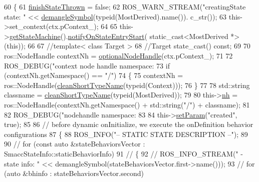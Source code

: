 \begin{DoxyCode}
60   \{
61     \hyperlink{classsmacc_1_1SmaccState_a6c40f733c35ddfb9ae2a2f8e9bab07d3}{finishStateThrown} = \textcolor{keyword}{false};
62     ROS\_WARN\_STREAM(\textcolor{stringliteral}{"creatingState state: "} << \hyperlink{namespacesmacc_a458f5e70d468824fbcd66cc7729deaa8}{demangleSymbol}(\textcolor{keyword}{typeid}(MostDerived).name()).
      c\_str());
63     this->set\_context(ctx.pContext\_);
64 
65     this->\hyperlink{classsmacc_1_1SmaccState_afc39f8e0ca4001b2159a100da2fccd0e}{getStateMachine}().\hyperlink{classsmacc_1_1ISmaccStateMachine_aeec54e997d715b105ebfeb5caadc4fbf}{notifyOnStateEntryStart}(
      static\_cast<MostDerived *>(\textcolor{keyword}{this}));
66 
67     \textcolor{comment}{//template< class Target >}
68     \textcolor{comment}{//Target state\_cast() const;}
69 
70     ros::NodeHandle contextNh = \hyperlink{namespacesmacc_aaf5c46d2834edc391571efd0acd05e6f}{optionalNodeHandle}(ctx.pContext\_);
71 
72     ROS\_DEBUG(\textcolor{stringliteral}{"context node handle namespace: %
73     \textcolor{keywordflow}{if} (contextNh.getNamespace() == \textcolor{stringliteral}{"/"})
74     \{
75       contextNh = ros::NodeHandle(\hyperlink{namespacesmacc_a09b297b1cdb9aae93a958f323431464a}{cleanShortTypeName}(\textcolor{keyword}{typeid}(Context)));
76     \}
77 
78     std::string classname = \hyperlink{namespacesmacc_a09b297b1cdb9aae93a958f323431464a}{cleanShortTypeName}(\textcolor{keyword}{typeid}(MostDerived));
79 
80     this->\hyperlink{classsmacc_1_1ISmaccState_a13fe6e6abfdb87996402189d44b78494}{nh} = ros::NodeHandle(contextNh.getNamespace() + std::string(\textcolor{stringliteral}{"/"}) + classname);
81 
82     ROS\_DEBUG(\textcolor{stringliteral}{"nodehandle namespace: %
83 
84     this->\hyperlink{classsmacc_1_1ISmaccState_a0b6c531ca8c446052022308548f55b92}{setParam}(\textcolor{stringliteral}{"created"}, \textcolor{keyword}{true});
85 
86     \textcolor{comment}{// before dynamic onInitialize, we execute the onDefinition behavior configurations}
87     \{
88       ROS\_INFO(\textcolor{stringliteral}{"-- STATIC STATE DESCRIPTION --"});
89 
90       \textcolor{comment}{// for (const auto &stateBehaviorsVector : SmaccStateInfo::staticBehaviorInfo)}
91       \textcolor{comment}{// \{}
92       \textcolor{comment}{//   ROS\_INFO\_STREAM(" - state info: " << demangleSymbol(stateBehaviorsVector.first->name()));}
93       \textcolor{comment}{//   for (auto &bhinfo : stateBehaviorsVector.second)}
}}
\end{DoxyCode}
